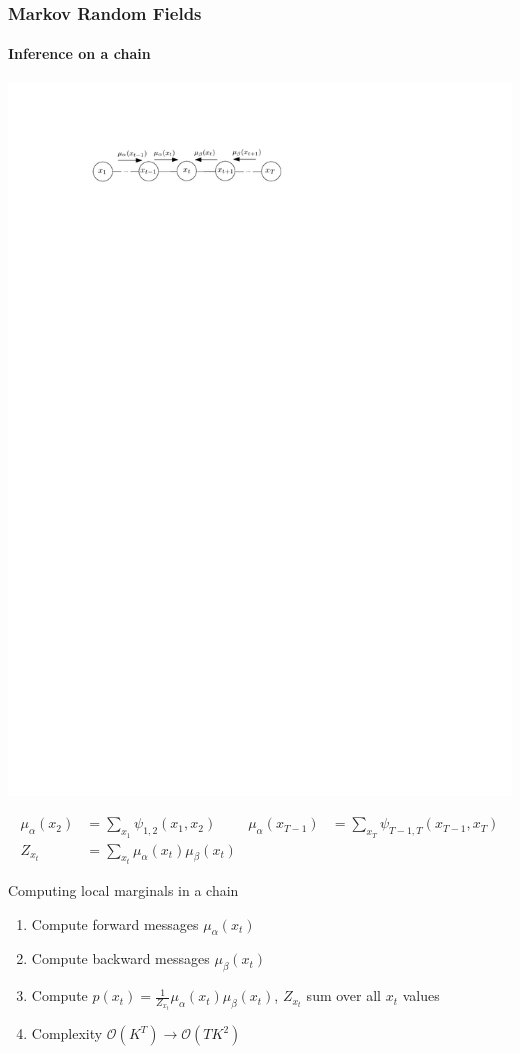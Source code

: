 \documentclass[slidestop,compress,mathserif]{beamer}
\begin{document}
\begin{frame}
	\frametitle{Markov Random Fields}
	\framesubtitle{Inference on a chain}
    \begin{center}
    \includegraphics[width=.6\textwidth]{chain2}
    \end{center}
    \begin{align*}
    \mu_\alpha(x_2) & = \sum_{x_1}\psi_{1,2}(x_1,x_2) &
    \mu_\alpha(x_{T-1}) & = \sum_{x_T}\psi_{T-1,T}(x_{T-1},x_T)\\
    Z_{x_t} & =\sum_{x_t}\mu_\alpha(x_t)\mu_\beta(x_t)
    \end{align*}
\vspace{-.5cm}
    \begin{block}{Computing local marginals in a chain}
     \begin{enumerate}
     \item Compute forward messages $\mu_\alpha(x_t)$
	\item Compute backward messages $\mu_\beta(x_t)$
      \item Compute $p(x_t)=\frac{1}{Z_{x_t}}\mu_{\alpha}(x_t)\mu_\beta(x_t)$, $Z_{x_t}$ sum over all $x_t$ values
\item Complexity $\mathcal{O}(K^T) \rightarrow \mathcal{O}(TK^2)$
     \end{enumerate}
    \end{block}
  \end{frame} 
\end{document}

